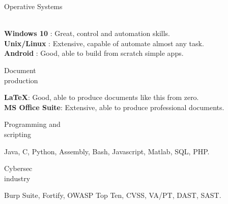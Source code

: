 \begin{minipage}{.3\textwidth}
	\flushright Operative Systems \\ \faWindows \ \faLinux \ \faApple \ \faAndroid
\end{minipage}
\hfill
\begin{minipage}{.65\textwidth}
	\vfill
	\textbf{Windows 10} \faWindows : Great, control and automation skills. 
	\\
	\textbf{Unix/Linux} \faLinux : Extensive, capable of automate almost any task.
	\\
	\textbf{Android} \faAndroid : Good, able to build from scratch simple apps.  
	\vfill
\end{minipage}

\bigskip

\begin{minipage}{.3\textwidth}
	\flushright Document \\ production \faBook 
\end{minipage}
\hfill
\begin{minipage}{.65\textwidth}
	\vfill
	\textbf{\LaTeX}: Good, able to produce documents like this from zero.
	\\
	\textbf{MS Office Suite}: Extensive, able to produce professional documents.
	\vfill
\end{minipage}

\bigskip

\begin{minipage}{.3\textwidth}
	\flushright Programming and \\ scripting \faTerminal
\end{minipage}
\hfill
\begin{minipage}{.65\textwidth}
	\vfill
	Java, C, Python, Assembly, Bash, Javascript, Matlab, SQL, PHP. 
	\vfill
\end{minipage}

\bigskip

\begin{minipage}{.3\textwidth}
	\flushright Cybersec \\ industry \faExpeditedssl
\end{minipage}
\hfill
\begin{minipage}{.64\textwidth}
	\vfill
	Burp Suite, Fortify, OWASP Top Ten, CVSS, VA/PT, DAST, SAST.
	\vfill
\end{minipage}